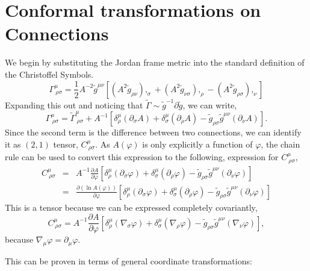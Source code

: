 \section{Conformal transformations on Connections}
We begin by substituting the Jordan frame metric into the standard definition of the Christoffel Symbols.
\begin{equation}
    \Gamma^{\mu}_{\ \rho\sigma} = \frac{1}{2}A^{-2}\tilde{g}^{\mu\nu}\left[(A^2\tilde{g}_{\rho\nu}),_{\sigma} + (A^2\tilde{g}_{\nu\sigma}),_{\rho}-(A^2\tilde{g}_{\rho\sigma}),_{\nu}\right]
\end{equation}
Expanding this out and noticing that $\tilde{\Gamma}\sim \tilde{g}^{-1}\partial \tilde{g}$, we can write,
\begin{equation}
    \Gamma^{\mu}_{\ \rho\sigma} = \tilde{\Gamma}^{\mu}_{\ \rho\sigma} + A^{-1}\left[\delta^{\mu}_{\rho}(\partial_{\sigma}A) + \delta^{\mu}_{\sigma}(\partial_{\rho}A) - \tilde{g}_{\rho\sigma}\tilde{g}^{\mu\nu}(\partial_{\nu}A)\right].
\end{equation}
Since the second term is the difference between two connections, we can identify it as $(2,1)$ tensor, $C^{\mu}_{\ \rho\sigma}$. As $A(\varphi)$ is only explicitly a function of $\varphi$, the chain rule can be used to convert this expression to the following, expression for $C^{\mu}_{\ \rho\sigma}$,
\begin{eqnarray}
    C^{\mu}_{\ \rho\sigma} &=& A^{-1}\frac{\partial A}{\partial\varphi}\left[\delta^{\mu}_{\rho}(\partial_{\sigma}\varphi) + \delta^{\mu}_{\sigma}(\partial_{\rho}\varphi) - \tilde{g}_{\rho\sigma}\tilde{g}^{\mu\nu}(\partial_{\nu}\varphi)\right]\nonumber\\
    &=& \frac{\partial (\ln A(\varphi))}{\partial\varphi}\left[\delta^{\mu}_{\rho}(\partial_{\sigma}\varphi) + \delta^{\mu}_{\sigma}(\partial_{\rho}\varphi) - \tilde{g}_{\rho\sigma}\tilde{g}^{\mu\nu}(\partial_{\nu}\varphi)\right]
\end{eqnarray}
This is a tensor because we can be expressed completely covariantly,
\begin{equation}
C^{\mu}_{\ \rho\sigma} = A^{-1}\frac{\partial A}{\partial\varphi}\left[\delta^{\mu}_{\rho}(\nabla_{\sigma}\varphi) + \delta^{\mu}_{\sigma}(\nabla_{\rho}\varphi) - \tilde{g}_{\rho\sigma}\tilde{g}^{\mu\nu}(\nabla_{\nu}\varphi)\right],
\end{equation}
because $\nabla_{\mu}\varphi = \partial_{\mu}\varphi$.

This can be proven in terms of general coordinate transformations: 

